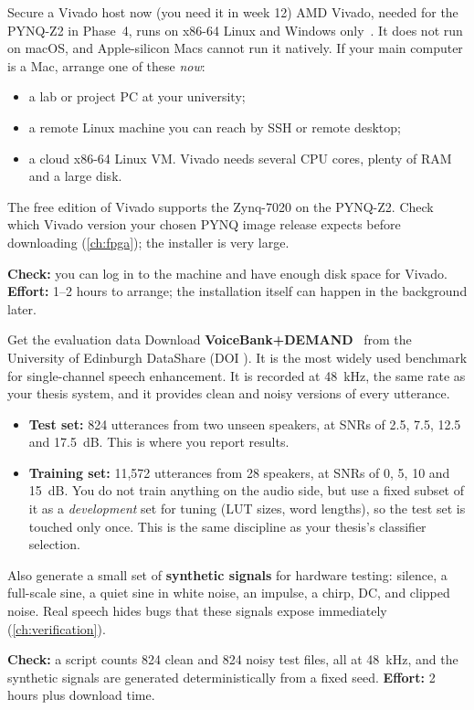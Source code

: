 \begin{stepbox}[label=st:setup:vivado]{Secure a Vivado host now (you need it in week 12)}
AMD Vivado, needed for the PYNQ-Z2 in Phase~4, runs on x86-64 Linux and Windows
only~\cite{ch12-13:ug973}. It does not run on macOS, and Apple-silicon Macs
cannot run it natively. If your main computer is a Mac, arrange one of these
\emph{now}:
\begin{itemize}
  \item a lab or project PC at your university;
  \item a remote Linux machine you can reach by SSH or remote desktop;
  \item a cloud x86-64 Linux VM. Vivado needs several CPU cores, plenty of RAM
        and a large disk.
\end{itemize}
The free edition of Vivado supports the Zynq-7020 on the PYNQ-Z2. Check which
Vivado version your chosen PYNQ image release expects before downloading
(\cref{ch:fpga}); the installer is very large.

\textbf{Check:} you can log in to the machine and have enough disk space for
Vivado. \textbf{Effort:} 1--2 hours to arrange; the installation itself can
happen in the background later.
\end{stepbox}

\begin{stepbox}[label=st:setup:data]{Get the evaluation data}
Download \textbf{VoiceBank+DEMAND}~\cite{valentini2016voicebank,valentini2017dataset}
from the University of Edinburgh DataShare (DOI ). It is the
most widely used benchmark for single-channel speech enhancement. It is recorded
at \qty{48}{\kHz}, the same rate as your thesis system, and it provides clean and
noisy versions of every utterance.

\begin{itemize}
  \item \textbf{Test set:} 824 utterances from two unseen speakers, at SNRs of
        2.5, 7.5, 12.5 and \qty{17.5}{\dB}. This is where you report results.
  \item \textbf{Training set:} 11,572 utterances from 28 speakers, at SNRs of 0,
        5, 10 and \qty{15}{\dB}. You do not train anything on the audio side, but
        use a fixed subset of it as a \emph{development} set for tuning (LUT sizes,
        word lengths), so the test set is touched only once.
        This is the same discipline as your thesis's classifier
        selection.
\end{itemize}
Also generate a small set of \textbf{synthetic signals} for hardware testing:
silence, a full-scale sine, a quiet sine in white noise, an impulse, a chirp, DC,
and clipped noise. Real speech hides bugs that these signals expose
immediately (\cref{ch:verification}).

\textbf{Check:} a script counts 824 clean and 824 noisy test files, all at
\qty{48}{\kHz}, and the synthetic signals are generated deterministically from a
fixed seed. \textbf{Effort:} 2 hours plus download time.
\end{stepbox}

